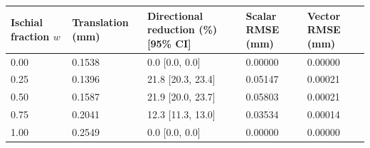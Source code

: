 \begin{tabular}{lllll}
\toprule
Ischial fraction $w$ & Translation (mm) & Directional reduction (\%) [95\% CI] & Scalar RMSE (mm) & Vector RMSE (mm) \\
\midrule
0.00 & 0.1538 & 0.0 [0.0, 0.0] & 0.00000 & 0.00000 \\
0.25 & 0.1396 & 21.8 [20.3, 23.4] & 0.05147 & 0.00021 \\
0.50 & 0.1587 & 21.9 [20.0, 23.7] & 0.05803 & 0.00021 \\
0.75 & 0.2041 & 12.3 [11.3, 13.0] & 0.03534 & 0.00014 \\
1.00 & 0.2549 & 0.0 [0.0, 0.0] & 0.00000 & 0.00000 \\
\bottomrule
\end{tabular}
